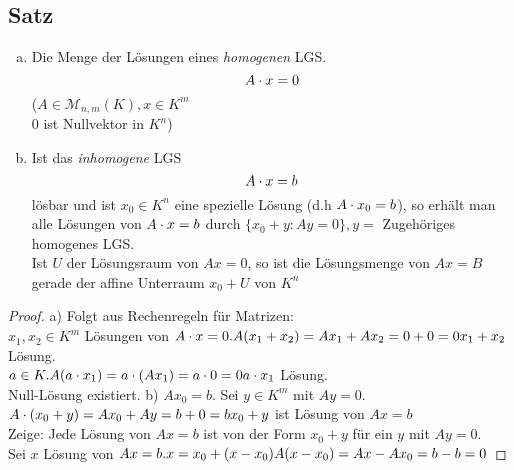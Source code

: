 \subsection{Satz}
\begin{enumerate}[a)]
\item Die Menge der Lösungen eines \emph{homogenen} LGS.\\
\[A \cdot x = 0\]
($A \in \mathcal{M}_{n,m}(K),x \in K^m$ \\
0 ist Nullvektor in $K^n$)
\item Ist das \emph{inhomogene} LGS $$A \cdot x = b$$ lösbar und ist $x_0 \in K^n$ eine spezielle Lösung (d.h $A \cdot x_0 = b$), so erhält man alle Lösungen von $A \cdot x = b$ durch $\{x_0+y: Ay = 0\}, y=$ Zugehöriges homogenes LGS.\\
Ist $U$ der Lösungsraum von $Ax =0$, so ist die Lösungsmenge von $Ax = B$ gerade der affine Unterraum $x_0 + U$ von $K^n$
\end{enumerate}
\begin{proof}
a) Folgt aus Rechenregeln für Matrizen:\\
$x_1,x_2 \in K^m$ Lösungen von $A \cdot x =0.\\
A(x_1+x_2) =  Ax_1 +Ax_2 = 0 + 0 = 0\\
x_1 + x_2$ Lösung.\\
$a \in K.\\
A(a\cdot x_1) = a \cdot (Ax_1) = a \cdot 0 = 0\\
a \cdot x_1$ Lösung.\\
Null-Lösung existiert.
b) $Ax_0 = b$. Sei $y \in K^m$ mit $Ay=0$.\\
$A\cdot(x_0+y) = Ax_0+Ay = b + 0 = b\\
x_0 + y$ ist Lösung von $Ax = b$\\
Zeige: Jede Lösung von $Ax = b$ ist von der Form $x_0 + y$ für ein $y$ mit $Ay =0$.\\
Sei $x$ Lösung von $Ax =b.\\
x = x_0 + (x-x_0)\\
A(x-x_0) = Ax -Ax_0 = b - b = 0$
\end{proof}
